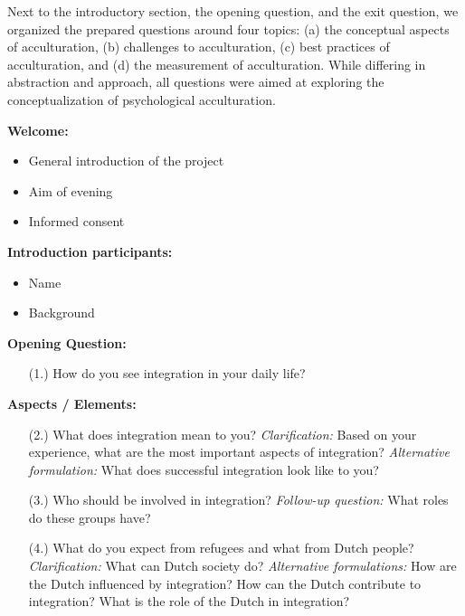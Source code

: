 \documentclass[man, 12pt, a4paper]{apa7}
\begin{document}
Next to the introductory section, the opening question, and the exit question, we organized the prepared questions around four topics: (a) the conceptual aspects of acculturation, (b) challenges to acculturation, (c) best practices of acculturation, and (d) the measurement of acculturation. While differing in abstraction and approach, all questions were aimed at exploring the conceptualization of psychological acculturation.

{\parindent0pt %

\textbf{Welcome:}
\begin{itemize}[noitemsep,topsep=0pt]
    \item General introduction of the project
    \item Aim of evening
    \item Informed consent
\end{itemize}

\textbf{Introduction participants:}
\begin{itemize}[noitemsep,topsep=0pt]
    \item Name
    \item Background
\end{itemize}

\textbf{Opening Question:}
\begin{enumerate}[noitemsep,topsep=0pt]
    \item [(1.)] How do you see integration in your daily life?
\end{enumerate}

\textbf{Aspects / Elements:}
\begin{enumerate}[noitemsep,topsep=0pt]
    \item [(2.)] What does integration mean to you?\newline
    \textit{Clarification:} Based on your experience, what are the most important aspects of integration?\newline
    \textit{Alternative formulation:} What does successful integration look like to you?
    \item [(3.)] Who should be involved in integration?\newline
    \textit{Follow-up question:} What roles do these groups have?
    \item [(4.)] What do you expect from refugees and what from Dutch people?\newline
    \textit{Clarification:} What can Dutch society do?\newline
    \textit{Alternative formulations:} How are the Dutch influenced by integration? How can the Dutch contribute to integration? What is the role of the Dutch in integration?
\end{enumerate}

}
\end{document}

